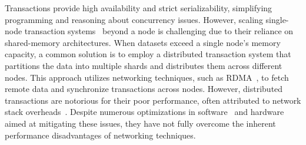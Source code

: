 
Transactions provide high availability and strict serializability, simplifying programming and reasoning about concurrency issues. However, scaling single-node transaction systems~\cite{silo_sosp13, abyss_vldb14, polyjuice_osdi21} beyond a node is challenging due to their reliance on shared-memory architectures. When datasets exceed a single node’s memory capacity, a common solution is to employ a distributed transaction system that partitions the data into multiple shards and distributes them across different nodes. This approach utilizes networking techniques, such as RDMA~\cite{farm_nsdi14, compromise, drtmh, fasst}, to fetch remote data and synchronize transactions across nodes. However, distributed transactions are notorious for their poor performance, often attributed to network stack overheads~\cite{farm_nsdi14, compromise, drtmh, fasst, grappa_atc15, guideline_atc16}. Despite numerous optimizations in software~\cite{fasst, drtmh, grappa_atc15, guideline_atc16} and hardware~\cite{ddio_ispass20, ddio-doc, farm_nsdi14, myth_vldb17, xenic_sosp21, ipipe_sigcomm19, linefs_sosp21} aimed at mitigating these issues, they have not fully overcome the inherent performance disadvantages of networking techniques.



